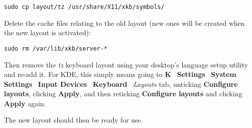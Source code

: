 \verb|sudo cp layout/tz /usr/share/X11/xkb/symbols/|

Delete the cache files relating to the old layout (new ones will be created when the new layout is activated):

\verb|sudo rm /var/lib/xkb/server-*|

Then remove the \textit{tz} keyboard layout using your desktop's language setup utility and re-add it.  For KDE, this simply means going to \textbf{K} \textrightarrow\ \textbf{Settings} \textrightarrow\ \textbf{System Settings} \textrightarrow\ \textbf{Input Devices} \textrightarrow\ \textbf{Keyboard} \textrightarrow\ \textit{Layouts} tab, unticking \textbf{Configure layouts}, clicking \textbf{Apply}, and then reticking \textbf{Configure layouts} and clicking \textbf{Apply} again.

The new layout should then be ready for use.



